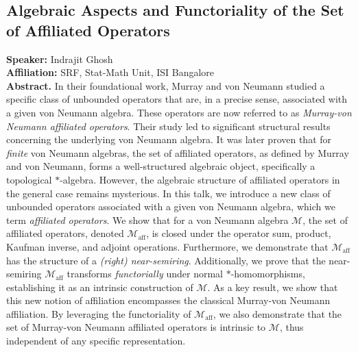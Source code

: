 %
%
\subsection*{Algebraic Aspects and Functoriality of the Set of Affiliated Operators}
\noindent
\textbf{Speaker:} Indrajit Ghosh \\ %
\textbf{Affiliation:} SRF, Stat-Math Unit, ISI Bangalore \\ %

\noindent\textbf{Abstract.}
In their foundational work, Murray and von Neumann studied a specific class of unbounded operators that are, in a precise sense, associated with a given von Neumann algebra. These operators are now referred to as \emph{Murray-von Neumann affiliated operators}. Their study led to significant structural results concerning the underlying von Neumann algebra. It was later proven that for \emph{finite} von Neumann algebras, the set of affiliated operators, as defined by Murray and von Neumann, forms a well-structured algebraic object, specifically a topological $*$-algebra. However, the algebraic structure of affiliated operators in the general case remains mysterious. In this talk, we introduce a new class of unbounded operators associated with a given von Neumann algebra, which we term \textit{affiliated operators}. We show that for a von Neumann algebra $\mathscr{M}$, the set of affiliated operators, denoted $\mathscr{M}_{\textrm{aff}}$, is closed under the operator sum, product, Kaufman inverse, and adjoint operations. Furthermore, we demonstrate that $\mathscr{M}_{\textrm{aff}}$ has the structure of a \textit{(right) near-semiring}. Additionally, we prove that the near-semiring $\mathscr{M}_{\textrm{aff}}$ transforms \textit{functorially} under normal $*$-homomorphisms, establishing it as an intrinsic construction of $\mathscr{M}$. As a key result, we show that this new notion of affiliation encompasses the classical Murray-von Neumann affiliation. By leveraging the functoriality of $\mathscr{M}_{\textrm{aff}}$, we also demonstrate that the set of Murray-von Neumann affiliated operators is intrinsic to $\mathscr{M}$, thus independent of any specific representation.


